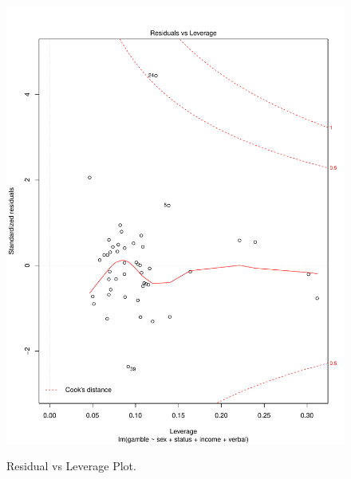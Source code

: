 \documentclass[12pt,letterpaper]{article}
\begin{document}
\begin{enumerate}[(a)]
	 \begin{figure}[h!]\centering
		\caption{\footnotesize Residual vs Leverage Plot.
		}\vspace{-1cm}
		\label{fig:plot1_c1}
		\includegraphics[width=.75\textwidth]{resid_leverage.pdf}\\
	\end{figure}


\end{enumerate}
\end{document}

